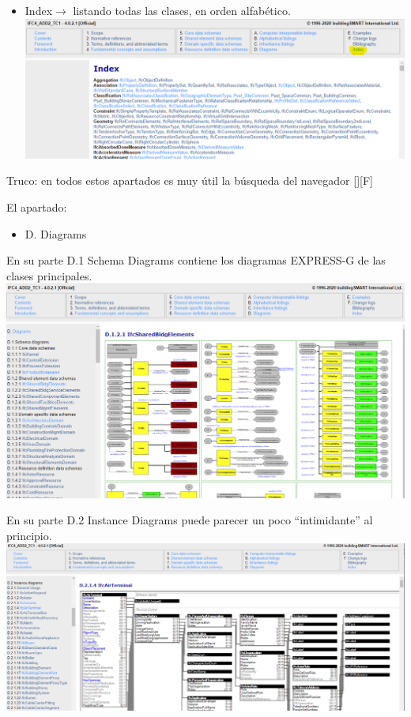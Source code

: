 \documentclass[spanish,10pt,a4paper,final,oneside]{article}
\begin{document}
\begin{itemize}
\item Index$\rightarrow$ listando todas las clases, en orden alfabético.
\\ \includegraphics[width=\textwidth]{IFC4 - Index}

\end{itemize}
Truco: en todos estos apartados es muy útil la búsqueda del navegador [\hspace{0,05cm}{\footnotesize CTRL}\hspace{0,05cm}]\hspace{0,1cm}[\hspace{0,05cm}F\hspace{0,05cm}]

\vspace{0.5cm}
El apartado:
\begin{itemize}
\item D. Diagrams
\end{itemize}

En su parte D.1 Schema Diagrams contiene los diagramas EXPRESS-G de las clases principales.
\\ \includegraphics[width=\textwidth]{IFC4 - D - Schema Diagrams}


En su parte D.2 Instance Diagrams puede parecer un poco ``intimidante'' al principio.
\\ \includegraphics[width=\textwidth]{IFC4 - D - Instance Diagrams}
\end{document}
